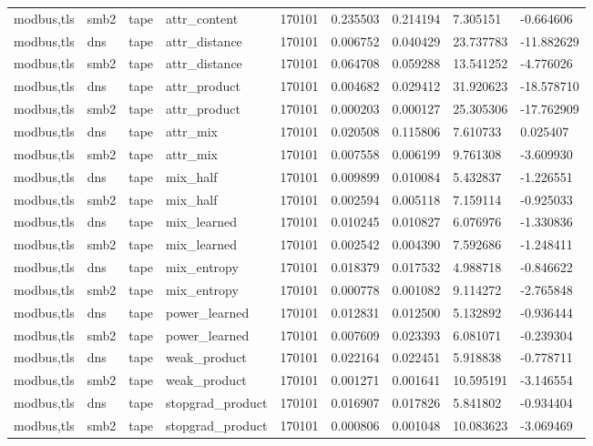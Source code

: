 \begin{tabular}{lllllllll}
modbus,tls & smb2 & tape & attr\_content & 170101 & 0.235503 & 0.214194 & 7.305151 & -0.664606 \\
modbus,tls & dns & tape & attr\_distance & 170101 & 0.006752 & 0.040429 & 23.737783 & -11.882629 \\
modbus,tls & smb2 & tape & attr\_distance & 170101 & 0.064708 & 0.059288 & 13.541252 & -4.776026 \\
modbus,tls & dns & tape & attr\_product & 170101 & 0.004682 & 0.029412 & 31.920623 & -18.578710 \\
modbus,tls & smb2 & tape & attr\_product & 170101 & 0.000203 & 0.000127 & 25.305306 & -17.762909 \\
modbus,tls & dns & tape & attr\_mix & 170101 & 0.020508 & 0.115806 & 7.610733 & 0.025407 \\
modbus,tls & smb2 & tape & attr\_mix & 170101 & 0.007558 & 0.006199 & 9.761308 & -3.609930 \\
modbus,tls & dns & tape & mix\_half & 170101 & 0.009899 & 0.010084 & 5.432837 & -1.226551 \\
modbus,tls & smb2 & tape & mix\_half & 170101 & 0.002594 & 0.005118 & 7.159114 & -0.925033 \\
modbus,tls & dns & tape & mix\_learned & 170101 & 0.010245 & 0.010827 & 6.076976 & -1.330836 \\
modbus,tls & smb2 & tape & mix\_learned & 170101 & 0.002542 & 0.004390 & 7.592686 & -1.248411 \\
modbus,tls & dns & tape & mix\_entropy & 170101 & 0.018379 & 0.017532 & 4.988718 & -0.846622 \\
modbus,tls & smb2 & tape & mix\_entropy & 170101 & 0.000778 & 0.001082 & 9.114272 & -2.765848 \\
modbus,tls & dns & tape & power\_learned & 170101 & 0.012831 & 0.012500 & 5.132892 & -0.936444 \\
modbus,tls & smb2 & tape & power\_learned & 170101 & 0.007609 & 0.023393 & 6.081071 & -0.239304 \\
modbus,tls & dns & tape & weak\_product & 170101 & 0.022164 & 0.022451 & 5.918838 & -0.778711 \\
modbus,tls & smb2 & tape & weak\_product & 170101 & 0.001271 & 0.001641 & 10.595191 & -3.146554 \\
modbus,tls & dns & tape & stopgrad\_product & 170101 & 0.016907 & 0.017826 & 5.841802 & -0.934404 \\
modbus,tls & smb2 & tape & stopgrad\_product & 170101 & 0.000806 & 0.001048 & 10.083623 & -3.069469 \\

\end{tabular}
